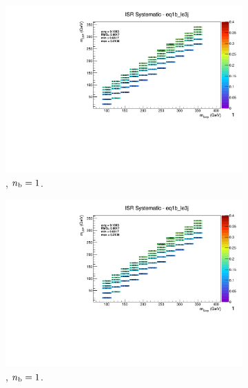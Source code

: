 \begin{figure}[ht!]
\begin{subfigure}[b]{0.32\textwidth}
    \includegraphics[width=\textwidth, page=9]{Figs/sms/t2cc/v37_3/systs/T2cc_ISR_eq1b_le3j.pdf}
    \caption{\njlow, $n_{\text{b}} = 1$.}
  \end{subfigure}
  \begin{subfigure}[b]{0.32\textwidth}
    \includegraphics[width=\textwidth, page=1]{Figs/sms/t2cc/v37_3/systs/T2cc_ISR_eq1b_le3j.pdf}
    \caption{\njlow, $n_{\text{b}} = 1$.}
  \end{subfigure}\\
  \begin{subfigure}[b]{0.32\textwidth}

\end{subfigure}
\end{figure}

